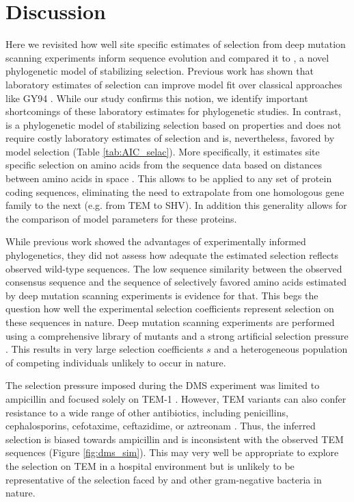 \section{Discussion}

Here we revisited how well site specific estimates of selection from deep mutation scanning experiments inform sequence evolution and compared it to \selac, a novel phylogenetic model of stabilizing selection.
Previous work has shown that laboratory estimates of selection can improve model fit over classical approaches like GY94 \citep{bloom2014, bloom2017}.
While our study confirms this notion, we identify important shortcomings of these laboratory estimates for phylogenetic studies.
In contrast, \selac is a phylogenetic model of stabilizing selection based on \PC properties and does not require costly laboratory estimates of selection and is, nevertheless, favored by model selection (Table \ref{tab:AIC_selac}).
More specifically, it estimates site specific selection on amino acids from the sequence data based on distances between amino acids in \PC space \citep{grantham1974,beaulieu2018}.
This allows \selac to be applied to any set of protein coding sequences, eliminating the need to extrapolate from one homologous gene family to the next (e.g. from TEM to SHV).
In addition this generality allows for the comparison of model parameters for these proteins.

While previous work showed the advantages of experimentally informed phylogenetics, they did not assess how adequate the estimated selection reflects observed wild-type sequences.
The low sequence similarity between the observed consensus sequence and the sequence of selectively favored amino acids estimated by deep mutation scanning experiments is evidence for that.
This begs the question how well the experimental selection coefficients represent selection on these sequences in nature.
Deep mutation scanning experiments are performed using a comprehensive library of mutants and a strong artificial selection pressure \citep{FirnbergAndOstermeier2012, Jain2014, FowlerAndFields2014, Fowler2014}.
This results in  very large selection coefficients $s$ and a heterogeneous population of competing individuals unlikely to occur in nature.

The selection pressure imposed during the DMS experiment was limited to ampicillin and focused solely on TEM-1 \citep{stiffler2016}.
However, TEM variants can also confer resistance to a wide range of other antibiotics, including penicillins, cephalosporins, cefotaxime, ceftazidime, or aztreonam \citep{sougakoff1988,sougakoff1989,goussard1991,mabilat1992,chanal1992,brun1994}.
Thus, the inferred selection is biased towards ampicillin and is inconsistent with the observed TEM sequences (Figure \ref{fig:dms_sim}).
This may very well be appropriate to explore the selection on TEM in a hospital environment but is unlikely to be representative of the selection faced by \ecoli and other gram-negative bacteria in nature.

